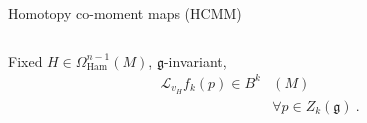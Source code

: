 \documentclass[beamer,handout,10pt]{standalone}
\begin{document}
\begin{frame}[shrink]{Homotopy co-moment maps (HCMM)}
\begin{columns}
			\begin{column}{.375\textwidth}
				\begin{propblock}
					Fixed $H\in \Omega^{n-1}_{\text{Ham}}(M)$, $\mathfrak{g}$-invariant,
					\begin{displaymath}
					\begin{split}
						\mathcal{L}_{v_H} f_k(p) \in B^k&(M) \\
						& \forall p \in Z_k(\mathfrak{g}) ~.
					\end{split}
					\end{displaymath}
				\end{propblock}
			\end{column}
		\end{columns}

\end{frame}
\end{document}
